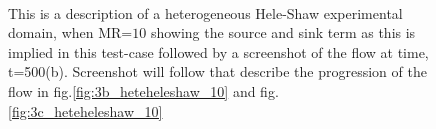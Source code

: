 \documentclass[preprint,authoryear,12pt]{elsarticle}
\begin{document}
\begin{figure}
\centering
{}\\[2mm]%
%
\caption{This is a description of a heterogeneous Hele-Shaw experimental domain, when MR=$10$ showing the source and sink term as this is implied in this test-case followed by a screenshot of the flow at time, t=500(b). Screenshot will follow that describe the progression of the flow in fig.\ref{fig:3b_heteheleshaw_10} and fig.\ref{fig:3c_heteheleshaw_10}}
\label{fig:3a_heteheleshaw_10}
\end{figure}
\end{document}
